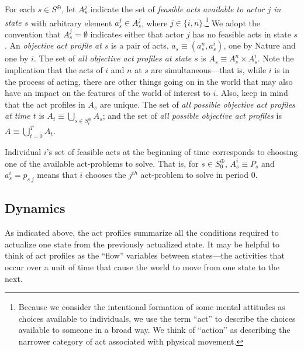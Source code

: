 \documentclass[
11pt,
titlepage,
reqno,
]{article}%
\theoremstyle{definition}
\begin{document}
For each  $s\in S^\oplus$, let $A^j_s$ indicate the set of \textit{feasible acts available to actor $j$ in state $s$} with arbitrary element $a^j_s\in A^j_s$, where $j\in\{i,n\}$.\footnote
{
	Because we consider the intentional formation of some mental attitudes as choices available to individuals, we use the term ``act'' to describe the choices available to someone in a broad way.
	We think of ``action'' as describing the narrower category of act associated with physical movement.
} 
We adopt the convention that $A^j_s=\emptyset$ indicates either that actor $j$ has no feasible acts in state $s$.
An \textit{objective act profile at $s$}  is a pair of acts, $a_s\equiv(a^n_s,a^i_s)$, one by Nature and one by $i$. 
The set of \textit{all objective act profiles at state $s$} is $A_s\equiv A^n_s\times A^i_s$.
Note the implication that the acts of $i$ and $n$ at $s$ are simultaneous---that is, while $i$ is in the process of acting, there are other things going on in the world that may also have an impact on the features of the world of interest to $i$.
Also, keep in mind that the act profiles in $A_s$ are unique.
The set of \textit{all possible objective act profiles at time $t$} is  $A_t\equiv \bigcup_{s\in S^\oplus_t} A_s$; and the set of \textit{all possible objective act profiles} is $A\equiv \bigcup_{t=0}^{T} A_t$. 

Individual $i$'s set of feasible acts at the beginning of time corresponds to choosing one of the available act-problems to solve. 
That is, for $s\in S^\oplus_0$, $A^i_s\equiv P_s$ and $a^i_s=p_{s.j}$ means that $i$ chooses the $j^{th}$ act-problem to solve in period 0. 



\subsection{Dynamics} 

As indicated above, the act profiles summarize all the conditions required to actualize one state from the previously actualized state. 
It may be helpful to think of act profiles as the ``flow'' variables between states---the activities that occur over a unit of time that cause the world to move from one state to the next.
\end{document}
